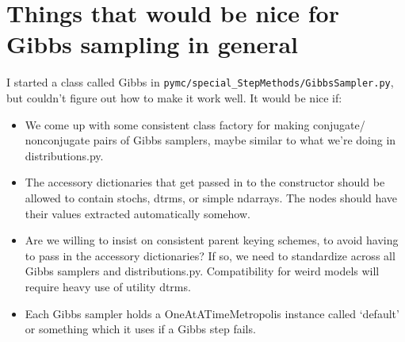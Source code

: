 \documentclass{article}
\begin{document}
\section{Things that would be nice for Gibbs sampling in general}
I started a class called Gibbs in \texttt{pymc/special\_StepMethods/GibbsSampler.py}, but couldn't figure out how to make it work well. It would be nice if:  
\begin{itemize}
	\item We come up with some consistent class factory for making conjugate/ nonconjugate pairs of Gibbs samplers, maybe similar to what we're doing in distributions.py.	
	\item The accessory dictionaries that get passed in to the constructor should be allowed to contain stochs, dtrms, or simple ndarrays. The nodes should have their values extracted automatically somehow.
	\item Are we willing to insist on consistent parent keying schemes, to avoid having to pass in the accessory dictionaries? If so, we need to standardize across all Gibbs samplers and distributions.py. Compatibility for weird models will require heavy use of utility dtrms.
	\item Each Gibbs sampler holds a OneAtATimeMetropolis instance called `default' or something which it uses if a Gibbs step fails.
\end{itemize} 
\end{document}
